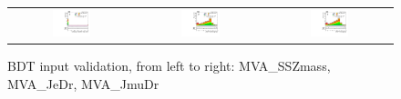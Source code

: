 \begin{figure}[tbh!]
 \begin{center}
 \begin{tabular}{ccc}
  \includegraphics[width=0.325\textwidth]{figures/Part3/BDT/SSZmass}&
    \includegraphics[width=0.325\textwidth]{figures/Part3/BDT/JeDr}&
  \includegraphics[width=0.325\textwidth]{figures/Part3/BDT/JmuDr}\\
 \end{tabular}
 \caption{BDT input validation, from left to right: MVA\_SSZmass, MVA\_JeDr, MVA\_JmuDr}
 \label{fig:input_vali_5}
 \end{center}
\end{figure}

